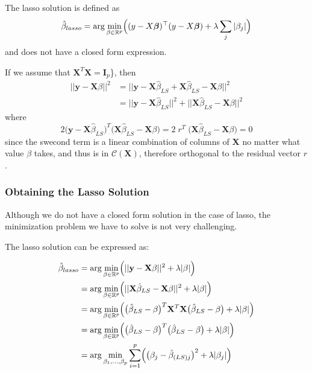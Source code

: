 \documentclass[
]{book}
\begin{document}
The lasso solution is defined as
\[\hat{\beta}_{lasso} = \arg \min_{\beta\in \mathbb{R}^{p}} \Bigl((y-X\boldsymbol{\beta})^\top(y-X\boldsymbol{\beta}) + \lambda \sum_j |\beta_j| \Bigr)\]
and does not have a closed form expression.

If we assume that \(\mathbf{X}^T\mathbf{X} = \mathbf{I}_p\)\}, then
\begin{align*}
||\mathbf{y} - \mathbf{X}\beta||^2 &= ||\mathbf{y} - \mathbf{X}\hat{\beta}_{LS} + \mathbf{X}\hat{\beta}_{LS} - \mathbf{X}\beta||^2\\
&=||\mathbf{y} - \mathbf{X}\hat{\beta}_{LS}||^2 + ||\mathbf{X}\hat{\beta}_{LS} - \mathbf{X}\beta||^2
\end{align*}
where
\[2  \bigl( \mathbf{y} - \mathbf{X}\hat{\beta}_{LS}\bigr)^T \bigl(  \mathbf{X}\hat{\beta}_{LS} - \mathbf{X}\beta \bigr) = 2 \; r^T \; \bigl(  \mathbf{X}\hat{\beta}_{LS} - \mathbf{X} \beta\bigr) =0\]
since the swecond term is a linear combination of columns of \(\mathbf{X}\) no matter what value \(\beta\) takes, and thus is in \(\mathcal{C}(\mathbf{X})\), therefore orthogonal to the residual vector \(r\).

\subsubsection*{Obtaining the Lasso Solution}\label{obtaining-the-lasso-solution}

Although we do not have a closed form solution in the case of lasso, the minimization problem we have to solve is not very challenging.

The lasso solution can be expressed as:

\begin{align*}
\hat{\beta}_{lasso} &= \arg \min_{\beta\in \mathbb{R}^{p}} \Bigl( ||\mathbf{y}-\mathbf{X} \beta||^2 + \lambda |\beta| \Bigr)\\
&= \arg \min_{\beta\in \mathbb{R}^{p}} \Bigl( ||\mathbf{X} \hat{\beta}_{LS} -\mathbf{X} \beta||^2 + \lambda |\beta| \Bigr)\\
&= \arg \min_{\beta\in \mathbb{R}^{p}} \Bigl( \bigl(  \hat{\beta}_{LS} - \beta \bigr)^T \mathbf{X}^T \mathbf{X}  \bigl(  \hat{\beta}_{LS} - \beta \bigr) + \lambda |\beta| \Bigr)\\
&= \arg \min_{\beta\in \mathbb{R}^{p}} \Bigl( \bigl(  \hat{\beta}_{LS} - \beta \bigr)^T  \bigl(  \hat{\beta}_{LS} - \beta \bigr) + \lambda |\beta| \Bigr)\\
&= \arg \min_{\beta_1, \ldots, \beta_p} \sum_{i=1}^{p}  \Bigl( \bigl(  \beta_{j} - \hat{\beta}_{(LS)j} \bigr)^2  + \lambda |\beta_j| \Bigr)\\
\end{align*}
\end{document}
